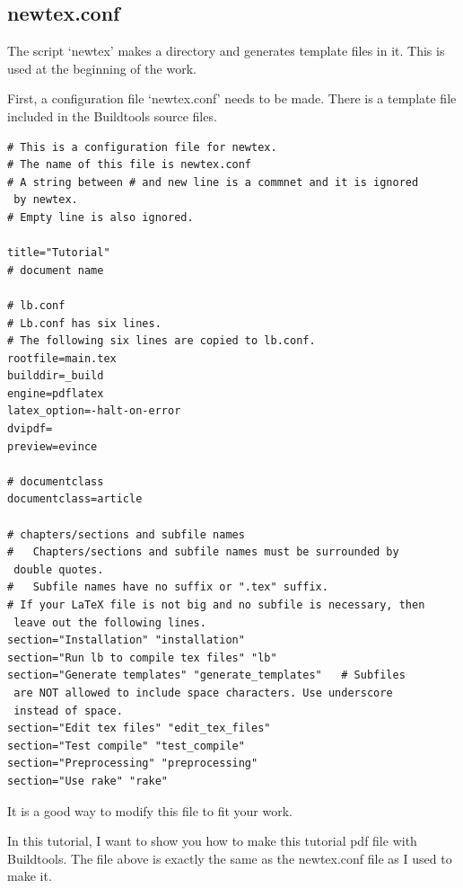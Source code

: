 \subsection{newtex.conf}
The script `newtex' makes a directory and generates template files in it.
This is used at the beginning of the work.

First, a configuration file `newtex.conf' needs to be made.
There is a template file included in the Buildtools source files.
\begin{verbatim}
# This is a configuration file for newtex.
# The name of this file is newtex.conf
# A string between # and new line is a commnet and it is ignored
 by newtex.
# Empty line is also ignored. 

title="Tutorial"
# document name

# lb.conf
# Lb.conf has six lines.
# The following six lines are copied to lb.conf.
rootfile=main.tex
builddir=_build
engine=pdflatex
latex_option=-halt-on-error
dvipdf=
preview=evince

# documentclass
documentclass=article

# chapters/sections and subfile names
#   Chapters/sections and subfile names must be surrounded by
 double quotes.
#   Subfile names have no suffix or ".tex" suffix.
# If your LaTeX file is not big and no subfile is necessary, then
 leave out the following lines.
section="Installation" "installation"
section="Run lb to compile tex files" "lb"
section="Generate templates" "generate_templates"   # Subfiles
 are NOT allowed to include space characters. Use underscore
 instead of space. 
section="Edit tex files" "edit_tex_files"
section="Test compile" "test_compile"
section="Preprocessing" "preprocessing"
section="Use rake" "rake"
\end{verbatim}
It is a good way to modify this file to fit your work.

In this tutorial, I want to show you how to make this tutorial pdf file with Buildtools.
The file above is exactly the same as the newtex.conf file as I used to make it.

